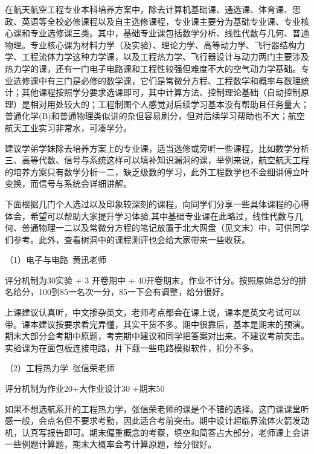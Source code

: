 \documentclass[11pt,oneside]{book}
\begin{document}
在航天航空工程专业本科培养方案中，除去计算机基础课、通选课、体育课、思政、英语等全校必修课程以及自主选修课程，专业课主要分为基础专业课、专业核心课和专业选修课三类。其中，基础专业课包括数学分析、线性代数与几何、普通物理。专业核心课为材料力学（及实验）、理论力学、高等动力学、飞行器结构力学、工程流体力学这种力学课，以及工程热力学、飞行器设计与动力两门主要涉及热力学的课，还有一门电子电路课和工程性较强但难度不大的空气动力学基础。专业选修课中有三门是必修的数学课，它们是常微分方程、工程数学和概率与数理统计；其他课程按照学分要求选课即可，其中计算方法、控制理论基础（自动控制原理）是相对用处较大的；工程制图个人感觉对后续学习基本没有帮助且任务量大；普通化学(B)和普通物理类似讲的杂但容易刷分，但对后续学习帮助也不大；航空航天工业实习非常水，可凑学分。

\vspace{10pt}

建议学弟学妹除去培养方案上的专业课，适当选修或旁听一些课程，比如数学分析三、高等代数、信号与系统这样可以填补知识漏洞的课，举例来说，航空航天工程的培养方案只有数学分析一二，缺乏级数的学习，此外工程数学也不会细讲傅立叶变换，而信号与系统会详细讲解。

\vspace{10pt}

下面根据几门个人选过以及印象较深刻的课程，向同学们分享一些具体课程的心得体会，希望可以帮助大家提升学习体验,其中基础专业课在此略过，线性代数与几何、普通物理一二以及常微分方程的笔记放置于北大网盘（见文末）中，可供同学们参考。此外，查看树洞中的课程测评也会给大家带来一些收获。

\vspace{10pt}

（1）电子与电路\ 黄迅老师 

评分机制为30实验 + 3 开卷期中 + 40开卷期末，作业不计分。按照原始总分的排名给分，100到85一名次一分，85一下会有调整，给分很好。

\vspace{10pt}

上课建议认真听，中文掺杂英文，老师考点都会在课上说，课本是英文考试可以带。课本建议按要求看完弄懂，其实干货不多。期中很靠后，基本是期末的预演。期末大部分会考期中原题，考完期中建议和同学把答案对出来。不建议考前突击。实验课为在面包板连接电路，并下载一些电路模拟软件，扣分不多。

\vspace{10pt}

（2）工程热力学\ 张信荣老师

评分机制为作业20+大作业设计30 +期末50

如果不想选航系开的工程热力学，张信荣老师的课是个不错的选择。这门课课堂听感一般，会点名但不要求考勤，因此适合考前突击。期中设计超临界流体火箭发动机，认真写报告即可。期末偏重概念的考察，填空和简答占大部分，老师课上会讲一些例题计算题，期末大概率会考计算原题，给分很好。
\end{document}
